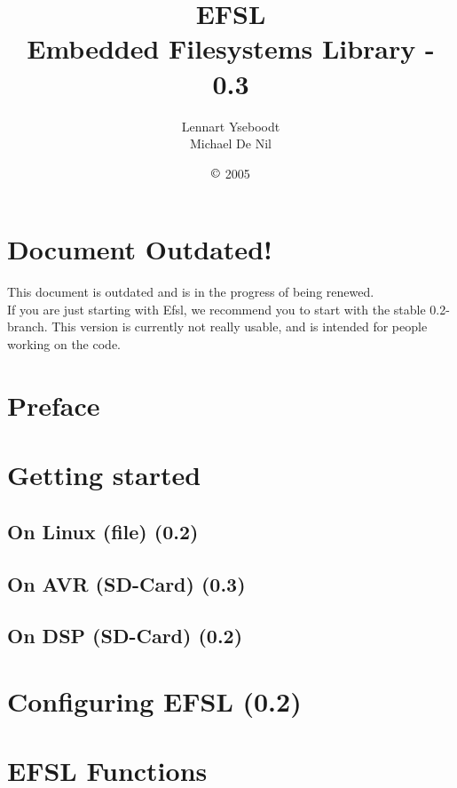 \documentclass[a4paper,fleqn]{article}
\begin{document}
\title{\Huge{EFSL}\\\Large{Embedded Filesystems Library - 0.3}}
\author{Lennart Yseboodt\\Michael De Nil}
\date{$\copyright$ 2005}
\maketitle

\newpage
\tableofcontents

\setlength{\parindent}{0pt}
\setlength{\parskip}{1ex plus 0.5ex minus 0.2ex}

\newpage
\section{Document Outdated!}
{\Huge{
This document is outdated and is in the progress of being renewed.\\
\newline\newline
If you are just starting with Efsl, we recommend you to start with the stable
0.2-branch. This version is currently not really usable, and is intended for people
working on the code.
}}
\newpage
\section{Preface}

\newpage
\section{Getting started}
\subsection{On Linux (file) (0.2)}
	
\newpage
\subsection{On AVR (SD-Card) (0.3)}
	
\newpage
\subsection{On DSP (SD-Card) (0.2)}
	

\newpage
\section{Configuring EFSL (0.2)}
	
	
\newpage
\section{EFSL Functions}
\end{document}
